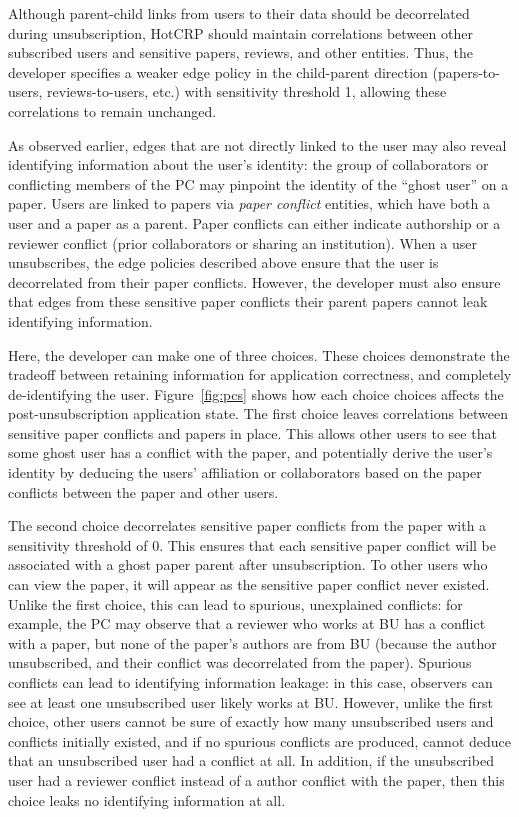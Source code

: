 Although parent-child links from users to their data should be decorrelated during unsubscription,
HotCRP should maintain correlations between other subscribed users and sensitive papers, reviews,
and other entities. Thus, the developer specifies a weaker edge policy in the child-parent
direction (papers-to-users, reviews-to-users, etc.) with sensitivity threshold 1, allowing these
correlations to remain unchanged.

As observed earlier, edges that are not directly linked to the user may also reveal identifying
information about the user's identity: the group of collaborators or conflicting members of the PC
may pinpoint the identity of the ``ghost user'' on a paper. Users are linked to papers via
\emph{paper conflict} entities, which have both a user and a paper as a parent.  Paper conflicts can
either indicate authorship or a reviewer conflict (prior collaborators or sharing an institution).
When a user unsubscribes, the edge policies described above ensure that the user is decorrelated from
their paper conflicts. However, the developer must also ensure that edges from these sensitive paper
conflicts their parent papers cannot leak identifying information.

Here, the developer can make one of three choices. These choices demonstrate the tradeoff between
retaining information for application correctness, and completely de-identifying the user.
Figure~\ref{fig:pcs} shows how each choice choices affects the post-unsubscription application state.
%
The first choice leaves correlations between sensitive paper conflicts and papers in place.
This allows other users to see that some ghost user has a conflict with the paper, and potentially
derive the user's identity by deducing the users' affiliation or collaborators based on the
paper conflicts between the paper and other users.

The second choice decorrelates sensitive paper conflicts from the paper with a sensitivity threshold
of 0. This ensures that each sensitive paper conflict will be associated with a ghost paper parent
after unsubscription. To other users who can view the paper, it will appear as the sensitive paper
conflict never existed. Unlike the first choice, this can lead to spurious, unexplained conflicts:
for example, the PC may observe that a reviewer who works at BU has a conflict with a paper, but
none of the paper's authors are from BU (because the author unsubscribed, and their conflict was
decorrelated from the paper). Spurious conflicts can lead to identifying information leakage: in
this case, observers can see at least one unsubscribed user likely works at BU. However, unlike the
first choice, other users cannot be sure of exactly how many unsubscribed users and conflicts
initially existed, and if no spurious conflicts are produced, cannot deduce that an unsubscribed
user had a conflict at all. In addition, if the unsubscribed user had a reviewer conflict instead of
a author conflict with the paper, then this choice leaks no identifying information at all.

